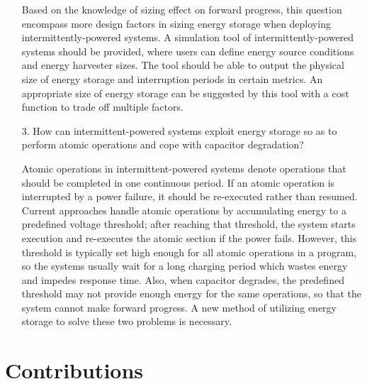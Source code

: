 \begin{itemize}
  Based on the knowledge of sizing effect on forward progress, this question encompass more design factors in sizing energy storage when deploying intermittently-powered systems. 
  A simulation tool of intermittently-powered systems should be provided, where users can define energy source conditions and energy harvester sizes. 
  The tool should be able to output the physical size of energy storage and interruption periods in certain metrics. 
  An appropriate size of energy storage can be suggested by this tool with a cost function to trade off multiple factors. 

  \item[3.] How can intermittent-powered systems exploit energy storage so as to perform atomic operations and cope with capacitor degradation? 
  
  Atomic operations in intermittent-powered systems denote operations that should be completed in one continuous period. 
  If an atomic operation is interrupted by a power failure, it should be re-executed rather than resumed. 
  Current approaches handle atomic operations by accumulating energy to a predefined voltage threshold; after reaching that threshold, the system starts execution and re-executes the atomic section if the power fails. 
  However, this threshold is typically set high enough for all atomic operations in a program, so the systems usually wait for a long charging period which wastes energy and impedes response time. 
  Also, when capacitor degrades, the predefined threshold may not provide enough energy for the same operations, so that the system cannot make forward progress. 
  A new method of utilizing energy storage to solve these two problems is necessary. 
  
\end{itemize}

\section{Contributions}


